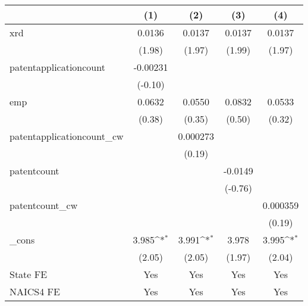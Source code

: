 {
\def\sym#1{\ifmmode^{#1}\else\(^{#1}\)\fi}
\begin{tabular}{l*{4}{c}}
\hline\hline
            &\multicolumn{1}{c}{(1)}         &\multicolumn{1}{c}{(2)}         &\multicolumn{1}{c}{(3)}         &\multicolumn{1}{c}{(4)}         \\
\hline
xrd         &      0.0136         &      0.0137         &      0.0137         &      0.0137         \\
            &      (1.98)         &      (1.97)         &      (1.99)         &      (1.97)         \\
[1em]
patentapplicationcount&    -0.00231         &                     &                     &                     \\
            &     (-0.10)         &                     &                     &                     \\
[1em]
emp         &      0.0632         &      0.0550         &      0.0832         &      0.0533         \\
            &      (0.38)         &      (0.35)         &      (0.50)         &      (0.32)         \\
[1em]
patentapplicationcount\_cw&                     &    0.000273         &                     &                     \\
            &                     &      (0.19)         &                     &                     \\
[1em]
patentcount &                     &                     &     -0.0149         &                     \\
            &                     &                     &     (-0.76)         &                     \\
[1em]
patentcount\_cw&                     &                     &                     &    0.000359         \\
            &                     &                     &                     &      (0.19)         \\
[1em]
\_cons      &       3.985\sym{*}  &       3.991\sym{*}  &       3.978         &       3.995\sym{*}  \\
            &      (2.05)         &      (2.05)         &      (1.97)         &      (2.04)         \\
[1em]
State FE    &         Yes         &         Yes         &         Yes         &         Yes         \\
[1em]
NAICS4 FE   &         Yes         &         Yes         &         Yes         &         Yes         \\

\end{tabular}}
